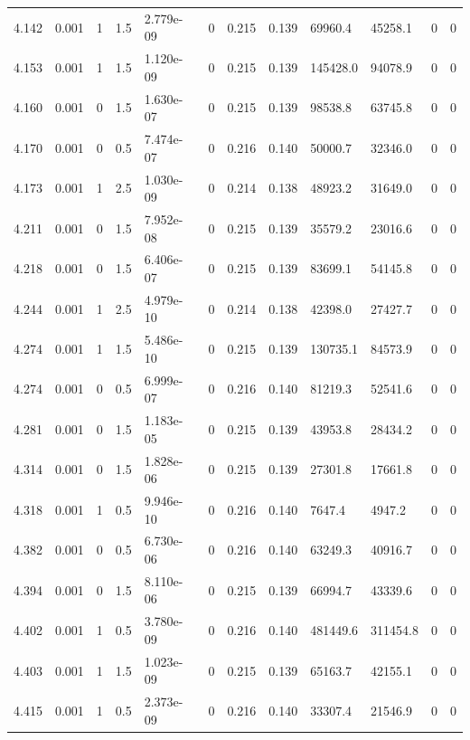\documentclass[preview]{standalone}
\begin{document}
{{{{{{{\begin{tabular}{L{1.2cm}C{1.2cm} C{0.3cm}C{0.5cm} C{1.4cm}C{1.4cm} C{1.4cm}C{1.4cm} C{1.6cm}C{1.6cm} C{1.6cm}C{1.6cm}}
  4.142  &  0.001  & 1     & 1.5 &  2.779e-09  & 0  &  0.215&   0.139& 69960.4 & 45258.1   &  0 & 0  \\ 
  4.153  &  0.001  & 1     & 1.5 &  1.120e-09  & 0  &  0.215&   0.139& 145428.0 & 94078.9   &  0 & 0  \\ 
  4.160  &  0.001  & 0     & 1.5 &  1.630e-07  & 0  &  0.215&   0.139& 98538.8 & 63745.8   &  0 & 0  \\ 
  4.170  &  0.001  & 0     & 0.5 &  7.474e-07  & 0  &  0.216&   0.140& 50000.7 & 32346.0   &  0 & 0  \\ 
  4.173  &  0.001  & 1     & 2.5 &  1.030e-09  & 0  &  0.214&   0.138& 48923.2 & 31649.0   &  0 & 0  \\ 
  4.211  &  0.001  & 0     & 1.5 &  7.952e-08  & 0  &  0.215&   0.139& 35579.2 & 23016.6   &  0 & 0  \\ 
  4.218  &  0.001  & 0     & 1.5 &  6.406e-07  & 0  &  0.215&   0.139& 83699.1 & 54145.8   &  0 & 0  \\ 
  4.244  &  0.001  & 1     & 2.5 &  4.979e-10  & 0  &  0.214&   0.138& 42398.0 & 27427.7   &  0 & 0  \\ 
  4.274  &  0.001  & 1     & 1.5 &  5.486e-10  & 0  &  0.215&   0.139& 130735.1 & 84573.9   &  0 & 0  \\ 
  4.274  &  0.001  & 0     & 0.5 &  6.999e-07  & 0  &  0.216&   0.140& 81219.3 & 52541.6   &  0 & 0  \\ 
  4.281  &  0.001  & 0     & 1.5 &  1.183e-05  & 0  &  0.215&   0.139& 43953.8 & 28434.2   &  0 & 0  \\ 
  4.314  &  0.001  & 0     & 1.5 &  1.828e-06  & 0  &  0.215&   0.139& 27301.8 & 17661.8   &  0 & 0  \\ 
  4.318  &  0.001  & 1     & 0.5 &  9.946e-10  & 0  &  0.216&   0.140& 7647.4 & 4947.2   &  0 & 0  \\ 
  4.382  &  0.001  & 0     & 0.5 &  6.730e-06  & 0  &  0.216&   0.140& 63249.3 & 40916.7   &  0 & 0  \\ 
  4.394  &  0.001  & 0     & 1.5 &  8.110e-06  & 0  &  0.215&   0.139& 66994.7 & 43339.6   &  0 & 0  \\ 
  4.402  &  0.001  & 1     & 0.5 &  3.780e-09  & 0  &  0.216&   0.140& 481449.6 & 311454.8   &  0 & 0  \\ 
  4.403  &  0.001  & 1     & 1.5 &  1.023e-09  & 0  &  0.215&   0.139& 65163.7 & 42155.1   &  0 & 0  \\ 
  4.415  &  0.001  & 1     & 0.5 &  2.373e-09  & 0  &  0.216&   0.140& 33307.4 & 21546.9   &  0 & 0  \\ 

\end{tabular}}}}}}}}
\end{document}
